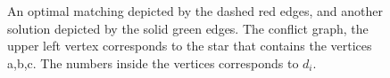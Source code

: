 \begin{figure}[h]
\centering

\caption[]{
\label{fig:conflict}
An optimal matching depicted by the dashed red edges,
and another solution depicted by the solid green edges.  
The conflict graph, the upper left vertex corresponds 
to the star that contains the vertices a,b,c.
The numbers inside the vertices corresponds to $d_i$.   
}
\end{figure}  

